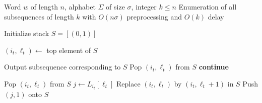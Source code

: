 \documentclass[runningheads,UKenglish,cleveref, autoref, thm-restate]{llncs}
\begin{document}
%
%
%
\begin{algorithm}
\caption{Enumerate Subsequences of Length $k$}
\begin{algorithmic}[1]
\Require Word $w$ of length $n$, alphabet $\Sigma$ of size $\sigma$, integer $k \leq n$
\Ensure Enumeration of all subsequences of length $k$ with $O(n\sigma)$ preprocessing and $O(k)$ delay

\State Initialize stack $S = [(0,1)]$ 

    \State $(i_t, \ell_t) \gets$ top element of $S$
    
     
        \State Output subsequence corresponding to $S$
        \State Pop $(i_t, \ell_t)$ from $S$
        \State \textbf{continue}
    \EndIf

        \State Pop $(i_t, \ell_t)$ from $S$ 
    \Else
        \State $j \gets L_{i_t}[\ell_t]$ 
        \State Replace $(i_t, \ell_t)$ by $(i_t, \ell_t + 1)$ in $S$
        \State Push $(j, 1)$ onto $S$
    \EndIf
\EndWhile
\end{algorithmic}
\end{algorithm}
\end{document}
